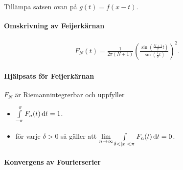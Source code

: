 \proof
Tillämpa satsen ovan på $g(t) = f(x - t)$.

\paragraph{Omskrivning av Feijerkärnan}
\begin{align*}
	F_{N}(t) = \frac{1}{2\pi (N + 1)}\left(\frac{\sin{\left(\frac{N + 1}{2}t\right)}}{\sin{\left(\frac{1}{2}t\right)}}\right)^{2}.
\end{align*}

\proof

\paragraph{Hjälpsats för Feijerkärnan}
$F_{N}$ är Riemannintegrerbar och uppfyller
\begin{itemize}
	\item $\int\limits_{-\pi}^{\pi}F_{n}(t)\dd{t} = 1$.
	\item för varje $\delta > 0$ så gäller att $\lim\limits_{n\to\infty}\int\limits_{\delta < \abs{x} < \pi}^{}F_{n}(t)\dd{t} = 0$.
\end{itemize}

\proof

\paragraph{Konvergens av Fourierserier}

